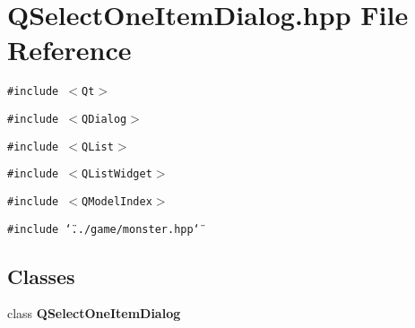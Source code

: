 \section{QSelect\-One\-Item\-Dialog.hpp File Reference}
\label{QSelectOneItemDialog_8hpp}
{\tt \#include $<$Qt$>$}\par
{\tt \#include $<$QDialog$>$}\par
{\tt \#include $<$QList$>$}\par
{\tt \#include $<$QList\-Widget$>$}\par
{\tt \#include $<$QModel\-Index$>$}\par
{\tt \#include \char`\"{}../game/monster.hpp\char`\"{}}\par
\subsection*{Classes}
\begin{CompactItemize}
\item 
class {\bf QSelect\-One\-Item\-Dialog}
\end{CompactItemize}
